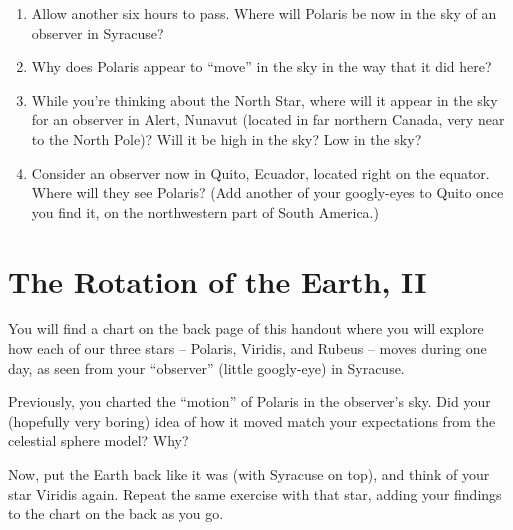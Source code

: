 \documentclass[12pt]{article}
\begin{document}
\begin{enumerate}
\item Allow another six hours to pass. Where will Polaris be now in the sky of an observer in Syracuse?

\vspace{1in}

\item Why does Polaris appear to ``move'' in the sky in the way that it did here?

\vspace{1in}

\item While you're thinking about the North Star, where will it appear in the sky for an observer in Alert, Nunavut (located in far northern Canada, very near to the North Pole)? Will it be high in the sky? Low in the sky?

\vspace{1in}

\item Consider an observer now in Quito, Ecuador, located right on the equator. Where will they see Polaris? (Add another of your googly-eyes to Quito once you find it, on the northwestern part of South America.)

\vspace{1in}

\end{enumerate}

\section{The Rotation of the Earth, II}

You will find a chart on the back page of this handout where you will explore how each of our three stars -- Polaris, Viridis, and Rubeus -- moves during one day, as seen from your ``observer'' (little googly-eye) in Syracuse. 

Previously, you charted the ``motion'' of Polaris in the observer's sky. Did your (hopefully very boring) idea of how it moved match your expectations from the celestial sphere model? Why?

\vspace{1in}




Now, put the Earth back like it was (with Syracuse on top), and think of your star Viridis again. Repeat the same exercise with that star, adding your findings to the chart on the back as you go.
\end{document}
